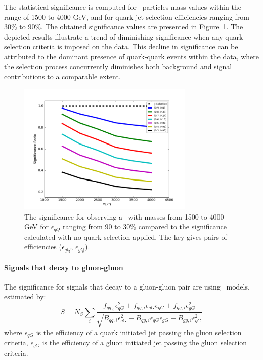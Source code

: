 The statistical significance is computed for \Zprime\ particles mass values within the range of 1500 to 4000 GeV, and for quark-jet selection efficiencies ranging from 30\% to 90\%. The obtained significance values are presented in Figure~\ref{fig:QuarkSignalSignificance}. The depicted results illustrate a trend of diminishing significance when any quark-selection criteria is imposed on the data. This decline in significance can be attributed to the dominant presence of quark-quark events within the data, where the selection process concurrently diminishes both background and signal contributions to a comparable extent.

\begin{figure}[htb]
	\centering
	\includegraphics[width=0.75\textwidth]{fig/tagging/QuarkSignalSignificance.png}
	\caption{ The significance for observing a \Zprime\ with masses from 1500 to 4000 GeV
		for $\epsilon_{qQ}$ ranging from 90 to 30\% compared to the significance calculated with no quark selection applied. The key gives pairs of efficiencies ($\epsilon_{qQ}$, $\epsilon_{gQ}$).
		\label{fig:QuarkSignalSignificance}}
\end{figure}


\paragraph{Signals that decay to gluon-gluon\\}
The significance for signals that decay to a gluon-gluon pair are using \Hprime\ models, estimated by:
\begin{equation}
S = N_S \sum_i{ \dfrac{ f_{qq,_i}\epsilon_{qG}^2 + f_{qg,i}\epsilon_{qG}\epsilon_{gG} + f_{gg,i}\epsilon_{gG}^2  } {\sqrt{ B_{qq,i}\epsilon_{qG}^2 + B_{qg,i}\epsilon_{qG}\epsilon_{gG} + B_{gg,i}\epsilon_{gG}^2  }}}
\end{equation}
where  
$\epsilon_{qG}$ is the efficiency of a quark initiated jet passing the gluon selection criteria, 
$\epsilon_{gG}$ is the efficiency of a gluon initiated jet passing the gluon selection criteria. 


